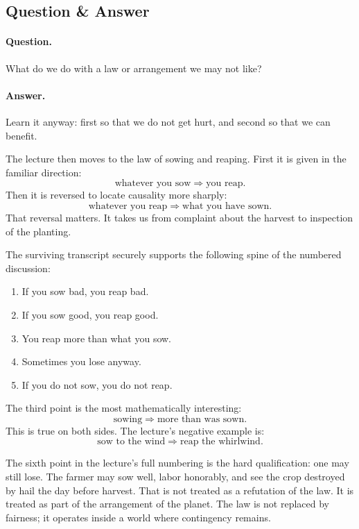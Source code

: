 \subsection{Question \& Answer}

\paragraph{Question.} What do we do with a law or arrangement we may not like?

\paragraph{Answer.} Learn it anyway: first so that we do not get hurt, and second so that we can benefit.

The lecture then moves to the law of sowing and reaping. First it is given in the familiar direction:
\begin{equation}
\text{whatever you sow} \Rightarrow \text{you reap}.
\end{equation}
Then it is reversed to locate causality more sharply:
\begin{equation}
\text{whatever you reap} \Rightarrow \text{what you have sown}.
\end{equation}
That reversal matters. It takes us from complaint about the harvest to inspection of the planting.

The surviving transcript securely supports the following spine of the numbered discussion:
\begin{enumerate}
\item If you sow bad, you reap bad.
\item If you sow good, you reap good.
\item You reap more than what you sow.
\item Sometimes you lose anyway.
\item If you do not sow, you do not reap.
\end{enumerate}

The third point is the most mathematically interesting:
\begin{equation}
\text{sowing} \Rightarrow \text{more than was sown}.
\end{equation}
This is true on both sides. The lecture's negative example is:
\begin{equation}
\text{sow to the wind} \Rightarrow \text{reap the whirlwind}.
\end{equation}

The sixth point in the lecture's full numbering is the hard qualification: one may still lose. The farmer may sow well, labor honorably, and see the crop destroyed by hail the day before harvest. That is not treated as a refutation of the law. It is treated as part of the arrangement of the planet. The law is not replaced by fairness; it operates inside a world where contingency remains.

